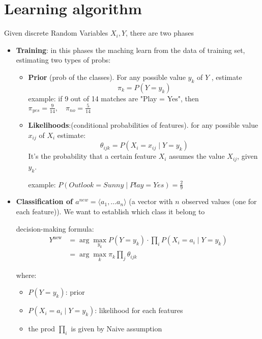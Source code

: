 \section{Learning algorithm}
Given discrete Random Variables $X_i, Y$, there are two phases
\begin{itemize}
    \item \textbf{Training}: in this phases the maching learn from the data of training set, estimating two types of probs:
    \begin{itemize}
        \item \textbf{Prior} (prob of the classes). For any possible value $y_k$ of $Y$ , estimate
        \[
            \pi_k = P(Y = y_k)
        \]
        example: if 9 out of 14 matches are "Play = Yes", then $\pi_{yes}= \frac{9}{14},\quad \pi_{no}= \frac{5}{14} $

        \item \textbf{Likelihoods}:(conditional probabilities of features). for any possible value $x_{ij}$ of $X_i$ estimate:
        \[
            \theta_{ijk} = P(X_i = x_{ij}\mid Y = y_k)
        \]
        It's the probability that a certain feature $X_i$ assumes the value $X_{ij}$, given $y_k$.

        example: $P(Outlook=Sunny\mid Play=Yes)=\frac{2}{9}$
    \end{itemize}
    \item \textbf{Classification of $a^{new} = \langle a_1 , \dots a_n \rangle$} (a vector with $n$ observed values (one for each feature)). We want to establish which class it belong to
    
    decision-making formula:
    \[
    \begin{aligned}
    Y^{\text{new}} &= \arg \max_{y_k} P(Y = y_{k}) \cdot \prod_{i} P(X_{i} = a_{i} \mid Y = y_{k}) \\
    &= \arg \max_{k} \pi_{k} \prod_{j} \theta_{ijk}
    \end{aligned}
    \]

    where:
    \begin{itemize}
        \item $P(Y=y_k)$: prior
        \item $P(X_i=a_i\mid Y=y_k)$: likelihood for each features
        \item the prod $\prod_{i}$ is given by Naive assumption
    \end{itemize}
\end{itemize}

